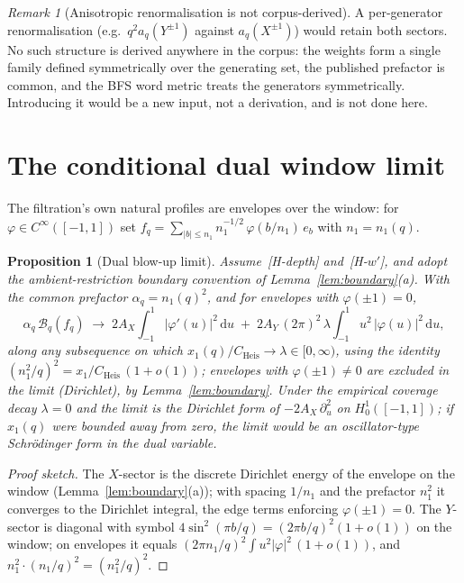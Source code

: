 \documentclass[11pt,a4paper]{article}
\theoremstyle{plain}
\newtheorem{proposition}[theorem]{Proposition}
\theoremstyle{definition}
\theoremstyle{remark}
\newtheorem{remark}[theorem]{Remark}
\newcommand{\CHeis}{C_{\mathrm{Heis}}}
\begin{document}
    \begin{remark}[Anisotropic renormalisation is not corpus-derived]
      \label{rem:aniso}
      A per-generator renormalisation (e.g.\ $q^2 a_q(Y^{\pm1})$ against $a_q(X^{\pm1})$) would retain
      both sectors.
      No such structure is derived anywhere in the corpus: the weights form a single family defined
      symmetrically over the generating set, the published prefactor is common, and the BFS word metric
      treats the generators symmetrically.
      Introducing it would be a new input, not a derivation, and is not done here.
    \end{remark}

  \section{The conditional dual window limit}
  \label{sec:blowup}

    The filtration's own natural profiles are envelopes over the window: for
    $\varphi \in C^\infty([-1,1])$ set
    $f_q = \sum_{|b| \le n_1} n_1^{-1/2}\, \varphi(b/n_1)\, e_b$ with $n_1 = n_1(q)$.

    \begin{proposition}[Dual blow-up limit]
      \label{prop:blowup}
      Assume~\textup{[H-depth]} and~\textup{[H-$w'$]}, and adopt the ambient-restriction boundary
      convention of Lemma~\ref{lem:boundary}\textup{(a)}.
      With the common prefactor $\alpha_q = n_1(q)^2$, and for envelopes with
      $\varphi(\pm 1) = 0$,
      \[
        \alpha_q\, \mathcal{B}_q(f_q)
        \;\longrightarrow\;
        2 A_X \int_{-1}^{1} |\varphi'(u)|^2\, \mathrm{d}u
        \;+\;
        2 A_Y\, (2\pi)^2\, \lambda \int_{-1}^{1} u^2\, |\varphi(u)|^2\, \mathrm{d}u ,
      \]
      along any subsequence on which $x_1(q)/\CHeis \to \lambda \in [0, \infty)$, using the
      identity $(n_1^2/q)^2 = x_1/\CHeis\,(1 + o(1))$; envelopes with $\varphi(\pm 1) \neq 0$ are
      excluded in the limit (Dirichlet), by Lemma~\ref{lem:boundary}.
      Under the empirical coverage decay $\lambda = 0$ and the limit is the Dirichlet form of
      $-2A_X\,\partial_u^2$ on $H^1_0([-1,1])$; if $x_1(q)$ were bounded away from zero, the limit
      would be an oscillator-type Schrödinger form in the dual variable.
    \end{proposition}

    \begin{proof}[Proof sketch]
      The $X$-sector is the discrete Dirichlet energy of the envelope on the window
      (Lemma~\ref{lem:boundary}(a)); with spacing $1/n_1$ and the prefactor $n_1^2$ it converges to
      the Dirichlet integral, the edge terms enforcing $\varphi(\pm 1) = 0$.
      The $Y$-sector is diagonal with symbol $4\sin^2(\pi b/q) = (2\pi b/q)^2(1 + o(1))$ on the
      window; on envelopes it equals $(2\pi n_1/q)^2 \int u^2 |\varphi|^2\, (1 + o(1))$, and
      $n_1^2 \cdot (n_1/q)^2 = (n_1^2/q)^2$.
    \end{proof}
\end{document}
